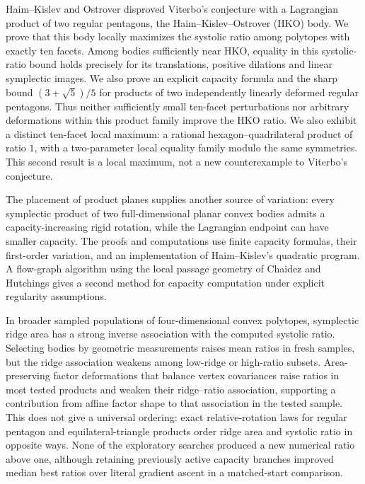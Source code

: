 Haim--Kislev and Ostrover disproved Viterbo's conjecture with a Lagrangian
product of two regular pentagons, the Haim--Kislev--Ostrover (HKO) body.
We prove that this body locally maximizes the systolic ratio among
polytopes with exactly ten facets. Among bodies sufficiently near HKO,
equality in this systolic-ratio bound holds precisely for its translations,
positive dilations and linear symplectic images. We also prove an explicit capacity formula and the sharp
bound $(3+\sqrt5)/5$ for products of two independently linearly deformed
regular pentagons. Thus neither sufficiently small ten-facet perturbations
nor arbitrary deformations within this product family improve the HKO ratio.
We also exhibit a distinct ten-facet local maximum: a rational
hexagon--quadrilateral product of ratio $1$, with a two-parameter local
equality family modulo the same symmetries. This second result is a local
maximum, not a new counterexample to Viterbo's conjecture.

The placement of product planes supplies another source of variation:
every symplectic product of two full-dimensional planar convex bodies admits
a capacity-increasing rigid rotation, while the Lagrangian endpoint can
have smaller capacity. The proofs and computations use finite capacity
formulas, their first-order variation, and an implementation of
Haim--Kislev's quadratic program. A flow-graph algorithm using the local
passage geometry of Chaidez and Hutchings gives a second method for
capacity computation under explicit regularity assumptions.

In broader sampled populations of four-dimensional convex polytopes,
symplectic ridge area has a strong inverse association with the computed
systolic ratio. Selecting bodies by geometric measurements raises mean
ratios in fresh samples, but the ridge association weakens among low-ridge
or high-ratio subsets. Area-preserving factor deformations that balance
vertex covariances raise ratios in most tested products and weaken their
ridge--ratio association, supporting a contribution from affine factor
shape to that association in the tested sample. This does not give a
universal ordering: exact relative-rotation laws for regular pentagon and
equilateral-triangle products order ridge area and systolic ratio in
opposite ways. None of the exploratory searches produced a new numerical
ratio above one, although retaining previously active capacity branches
improved median best ratios over literal gradient ascent in a matched-start
comparison.
